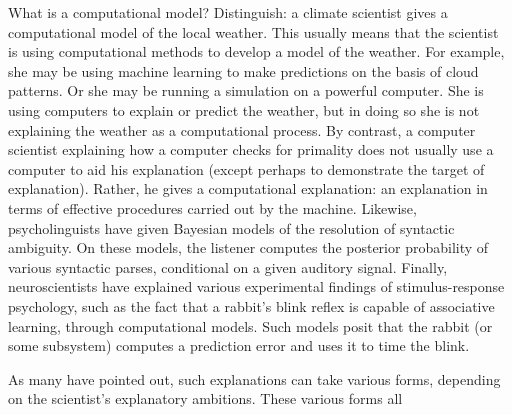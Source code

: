 What is a computational model?
Distinguish: a climate scientist gives a computational model of the local weather.
This usually means that the scientist is using computational methods to develop a model of the weather.
For example, she may be using machine learning to make predictions on the basis of cloud patterns.
Or she may be running a simulation on a powerful computer.
She is using computers to explain or predict the weather, but in doing so she is not explaining the weather as a computational process.
By contrast, a computer scientist explaining how a computer checks for primality does not usually use a computer to aid his explanation (except perhaps to demonstrate the target of explanation).
Rather, he gives a computational explanation: an explanation in terms of effective procedures carried out by the machine.
Likewise, psycholinguists have given Bayesian models of the resolution of syntactic ambiguity.
On these models, the listener computes the posterior probability of various syntactic parses, conditional on a given auditory signal.
Finally, neuroscientists have explained various experimental findings of stimulus-response psychology, such as the fact that a rabbit's blink reflex is capable of associative learning, through computational models.
Such models posit that the rabbit (or some subsystem) computes a prediction error and uses it to time the blink.




As many have pointed out, such explanations can take various forms, depending on the scientist's explanatory ambitions.
These various forms all 
